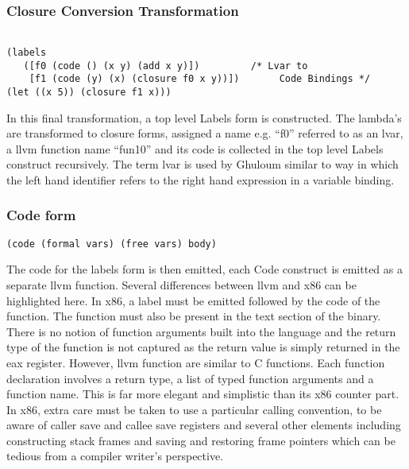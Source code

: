\documentclass{article}
\begin{document}
\subsubsection{Closure Conversion Transformation}

\begin{verbatim}

(labels 
   ([f0 (code () (x y) (add x y)])         /* Lvar to 
    [f1 (code (y) (x) (closure f0 x y))])       Code Bindings */
(let ((x 5)) (closure f1 x)))
\end{verbatim}

In this final transformation, a top level Labels form is constructed. The lambda's are transformed to closure forms, assigned a name e.g. ``f0'' referred to as an lvar, a llvm function name ``fun10'' and its code is collected in the top level Labels construct recursively. The term lvar is used by Ghuloum similar to way in which the left hand identifier refers to the right hand expression in a variable binding.


\subsubsection{Code form}

\begin{verbatim}
(code (formal vars) (free vars) body)
\end{verbatim}

The code for the labels form is then emitted, each Code construct is emitted as a separate llvm function. Several differences between llvm and x86 can be highlighted here. In x86, a label must be emitted followed by the code of the function. The function must also be present in the text section of the binary. There is no notion of function arguments built into the language and the return type of the function is not captured as the return value is simply returned in the eax register. However, llvm function are similar to C functions. Each function declaration involves a return type, a list of typed function arguments and a function name. This is far more elegant and simplistic than its x86 counter part. In x86, extra care must be taken to use a particular calling convention, to be aware of caller save and callee save registers and several other elements including constructing stack frames and saving and restoring frame pointers which can be tedious from a compiler writer's perspective. 
\end{document}
